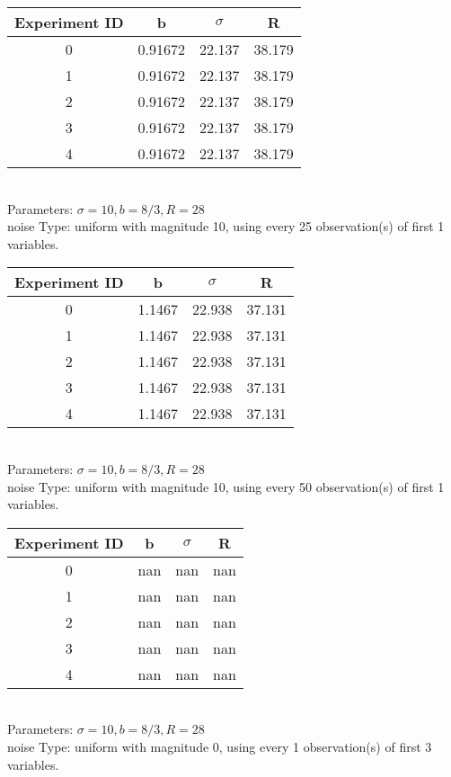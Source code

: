 \begin{multicols}{3}
\begin{tabular}{cccc}
\hline Experiment ID & b & $\sigma$ & R \\ \hline 
0 & 0.91672 & 22.137 & 38.179\\ \hline 
 1 & 0.91672 & 22.137 & 38.179\\ \hline 
 2 & 0.91672 & 22.137 & 38.179\\ \hline 
 3 & 0.91672 & 22.137 & 38.179\\ \hline 
 4 & 0.91672 & 22.137 & 38.179\\ \hline 
 \end{tabular}\\
Parameters: $\sigma=10, b=8/3, R=28$\\
noise Type: uniform with magnitude 10, using every 25 observation(s) of first 1 variables.\\
\begin{tabular}{cccc}
\hline Experiment ID & b & $\sigma$ & R \\ \hline 
0 & 1.1467 & 22.938 & 37.131\\ \hline 
 1 & 1.1467 & 22.938 & 37.131\\ \hline 
 2 & 1.1467 & 22.938 & 37.131\\ \hline 
 3 & 1.1467 & 22.938 & 37.131\\ \hline 
 4 & 1.1467 & 22.938 & 37.131\\ \hline 
 \end{tabular}\\
Parameters: $\sigma=10, b=8/3, R=28$\\
noise Type: uniform with magnitude 10, using every 50 observation(s) of first 1 variables.\\
\begin{tabular}{cccc}
\hline Experiment ID & b & $\sigma$ & R \\ \hline 
0 & nan & nan & nan\\ \hline 
 1 & nan & nan & nan\\ \hline 
 2 & nan & nan & nan\\ \hline 
 3 & nan & nan & nan\\ \hline 
 4 & nan & nan & nan\\ \hline 
 \end{tabular}\\
Parameters: $\sigma=10, b=8/3, R=28$\\
noise Type: uniform with magnitude 0, using every 1 observation(s) of first 3 variables.\\
\begin{tabular}{cccc}

\end{tabular}
\end{multicols}

